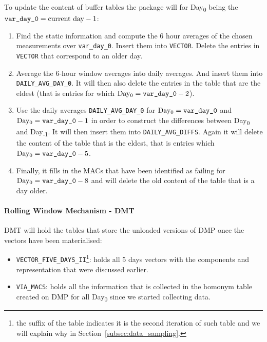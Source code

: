 To update the content of buffer tables the package will for Day\textsubscript{0} being the $ \text{\texttt{var\_day\_0}}=\text{current day} - 1$:
\begin{enumerate}
\item Find the static information and compute the 6 hour averages of the chosen measurements over \texttt{var\_day\_0}. Insert them into \texttt{VECTOR}. Delete the entries in \texttt{VECTOR} that correspond to an older day.
\item Average the 6-hour window averages into daily averages. And insert them into \texttt{DAILY\_AVG\_DAY\_0}. It will then also delete the entries in the table that are the eldest (that is entries for which $\text{Day\textsubscript{0}}=\text{\texttt{var\_day\_0}}-2$).
\item Use the daily averages \texttt{DAILY\_AVG\_DAY\_0} for $\text{Day\textsubscript{0}}=\text{\texttt{var\_day\_0}}$ and $\text{Day\textsubscript{0}}=\text{\texttt{var\_day\_0}}-1$ in order to construct the differences between Day\textsubscript{0} and Day\textsubscript{-1}. It will then insert them into \texttt{DAILY\_AVG\_DIFFS}. Again it will delete the content of the table that is the eldest, that is entries which $\text{Day\textsubscript{0}}=\text{\texttt{var\_day\_0}}-5$.
\item Finally, it fills in the MACs that have been identified as failing for $\text{Day\textsubscript{0}}=\text{\texttt{var\_day\_0}}-8$ and will delete the old content of the table that is a day older. 
\end{enumerate}

\paragraph{Rolling Window Mechanism - DMT}
DMT will hold the tables that store the unloaded versions of DMP once the vectors have been materialised:
\begin{itemize}
	\item \texttt{VECTOR\_FIVE\_DAYS\_II}\footnote{the suffix of the table indicates it is the second iteration of such table and we will explain why in Section~\ref{subsec:data_sampling}.}: holds all 5 days vectors with the components and representation that were discussed earlier.
	\item \texttt{VIA\_MACS}: holds all the information that is collected in the homonym table created on DMP for all Day\textsubscript{0} since we started collecting data.
\end{itemize}

